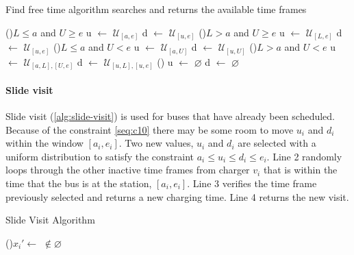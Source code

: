 \documentclass[11pt,a4paper,final]{article}
\newcommand{\I}{\mathbb{I}}                 %
\newcommand{\C}{\mathbb{C}}                 %
\newcommand{\U}{\mathcal{U}}                %
\newcommand{\Sol}{\mathbb{S}}               %
\begin{document}
\begin{algorithm}[H]
\caption{Find free time algorithm searches and returns the available time frames} \label{alg:find-free-time}
    \LinesNumbered

    \Begin
    {
        \If(\tcc*[f]{If $L < a < e < U]$ (\autoref{subfig:sandwich})}){$L \leq a$ and $U \geq e$}
        {
                u $\leftarrow$ $\U_{[a,e]}$\;
                d $\leftarrow$ $\U_{[u,e]}$\;
        }
        \ElseIf(){$L > a$ and $U \geq e$}
        {
                u $\leftarrow$ $\U_{[L,e]}$\;
                d $\leftarrow$ $\U_{[u,e]}$\;
        }
        \ElseIf(){$L \leq a$ and $U < e$}
        {
                u $\leftarrow$ $\U_{[a,U]}$\;
                d $\leftarrow$ $\U_{[u,U]}$\;
        }
        \ElseIf(){$L > a$ and $U < e$}
        {
                u $\leftarrow$ $\U_{[a,L], [U,e]}$\;
                d $\leftarrow$ $\U_{[u,L], [u,e]}$\;
        }
        \Else()
        {
                u $\leftarrow$ $\varnothing$\;
                d $\leftarrow$ $\varnothing$\;
        }

    }
\end{algorithm}

\paragraph{Slide visit}
\label{slide-visit}
Slide visit (\ref{alg:slide-visit}) is used for buses that have already been scheduled. Because of the constraint
\ref{seq:c10} there may be some room to move \(u_i\) and \(d_i\) within the window \([a_i, e_i]\). Two new values, \(u_i\) and
\(d_i\) are selected with a uniform distribution to satisfy the constraint \(a_i \leq u_i \leq d_i \leq e_i\). Line 2 randomly loops
through the other inactive time frames from charger \(v_i\) that is within the time that the bus is at the station, \([a_i,
e_i]\). Line 3 verifies the time frame previously selected and returns a new charging time. Line 4 returns the new visit.

\begin{algorithm}[H]
\caption{Slide Visit Algorithm} \label{alg:slide-visit}
    \LinesNumbered
    \KwIn{$\Sol$}
    \KwOut{$\I_i'$}

    \Begin
    {
        \While {$C_q^j \in \{[a_i, e_i]\} \subset \U_{\C_{v_i}}$}
        {
            \If(){$x_i' \leftarrow$  $\not\in \varnothing$}
            {
                \Return{$\I_i \leftarrow x_i'$} 
            }
        }
    }
\end{algorithm}
\end{document}
